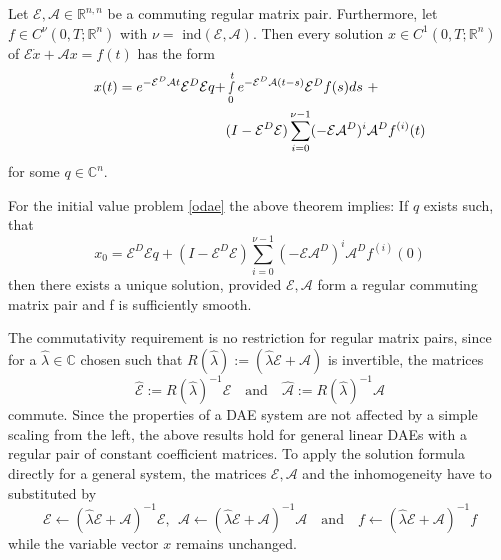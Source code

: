 \documentclass[a4paper,10pt,BCOR=15mm]{scrbook}
\providecommand{\andi}[0]{\quad \text{and} \quad}
\begin{document}
\begin{thm}
 Let $\mathcal{E},\mathcal{A} \in \mathbb{R}^{n,n}$ be a commuting regular matrix pair. Furthermore, let $f\in C^\nu (0,T;\mathbb{R}^n)$ with $\nu = \mbox{ ind}(\mathcal{E,A})$. Then every solution $x\in C^1 (0,T;\mathbb{R}^n)$ of $ \mathcal{E} \dot{x} + \mathcal{A}x=f(t)$ has the form
\begin{equation}\label{solf}
\begin{split}
    x(t) = e^{-\mathcal{E}^D\mathcal{A}t}\mathcal{E}^D\mathcal{E}q+&\smallint_0^t e^{-\mathcal{E}^D\mathcal{A}(t-s)}\mathcal{E}^Df(s) ds~+ \\
& (I-\mathcal{E}^D\mathcal{E}) \sum_{i=0}^{\nu-1}(-\mathcal{E}\mathcal{A}^D)^i\mathcal{A}^Df^{(i)}(t)
\end{split}
\end{equation}
for some $q\in \mathbb{C}^n$.
\end{thm}

For the initial value problem \eqref{odae} the above theorem implies: If $q$ exists such, that 
\begin{equation}\label{consi}
     x_0 = \mathcal{E}^D\mathcal{E}q+ (I-\mathcal{E}^D\mathcal{E}) \sum_{i=0}^{\nu-1}(-\mathcal{E}\mathcal{A}^D)^i\mathcal{A}^Df^{(i)}(0)
\end{equation}
then there exists a unique solution, provided $\mathcal E,\mathcal A$ form a regular commuting matrix pair and f is sufficiently smooth.

The commutativity requirement is no restriction for regular matrix pairs, since for a $\hat \lambda \in \mathbb C$ chosen such that $R(\hat \lambda) := (\hat \lambda \mathcal E + \mathcal A)$ is invertible, the matrices 
\begin{equation*}
 \hat{ \mathcal E} := R(\hat \lambda)^{-1} \mathcal E \andi \hat{ \mathcal A} := R(\hat \lambda)^{-1} \mathcal A
\end{equation*}
commute. Since the properties of a DAE system are not affected by a simple scaling from the left, the above results hold for general linear DAEs with a regular pair of constant coefficient matrices. To apply the solution formula directly for a general system, the matrices $\mathcal E, \mathcal A$ and the inhomogeneity have to substituted by
\begin{equation*}
 \mathcal E \leftarrow (\hat \lambda \mathcal E + \mathcal A)^{-1} \mathcal E, ~~ \mathcal A \leftarrow (\hat \lambda \mathcal E + \mathcal A)^{-1} \mathcal A \andi  f \leftarrow (\hat \lambda \mathcal E + \mathcal A)^{-1} f
\end{equation*}
while the variable vector $x$ remains unchanged.
\end{document}
